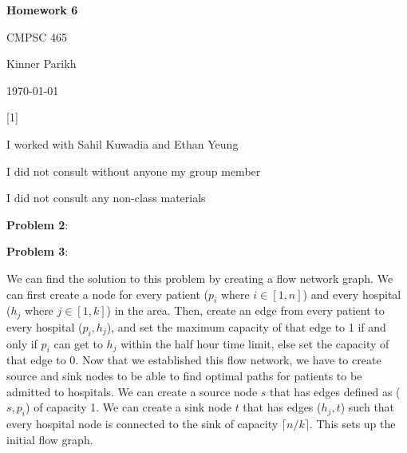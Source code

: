 \documentclass{article} %
\newcommand{\question}[2][]{\begin{flushleft}
        \textbf{Problem #1}: \textit{#2}

\end{flushleft}}
\newcommand{\maketitletwo}[2][]{\begin{center}
        \Large{\textbf{Homework #1}
            
            CMPSC 465} %
        \vspace{5pt}
        
        \normalsize{Kinner Parikh  %
        
        \today}        %
        \vspace{40pt}


        \newpage
        
\end{center}}
\begin{document}
    \maketitletwo[6]  %

    \question[1]{}
    \begin{center}
        
        I worked with Sahil Kuwadia and Ethan Yeung
    
        I did not consult without anyone my group member
    
        I did not consult any non-class materials
    \end{center}
    
    \newpage

    \question[2]{}

    \newpage

    \question[3]{}

    We can find the solution to this problem by creating a flow network graph. We can first create a node for every patient ($p_i$ where $i \in [1,n]$) and every hospital ($h_j$ where $j \in [1,k]$) in the area. Then, create an edge from every patient to every hospital ($p_i, h_j$), and set the maximum capacity of that edge to 1 if and only if $p_i$ can get to $h_j$ within the half hour time limit, else set the capacity of that edge to 0. Now that we established this flow network, we have to create source and sink nodes to be able to find optimal paths for patients to be admitted to hospitals. We can create a source node $s$ that has edges defined as ($s, p_i$) of capacity 1. We can create a sink node $t$ that has edges ($h_j, t$) such that every hospital node is connected to the sink of capacity $\lceil n/k \rceil$. This sets up the initial flow graph.
\end{document}
